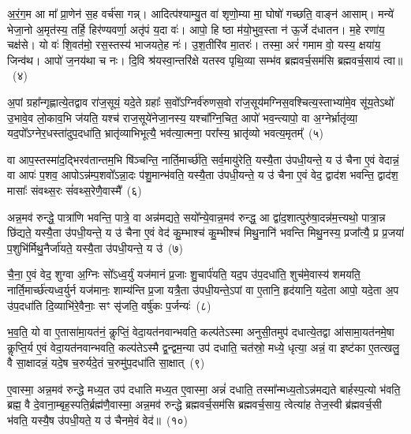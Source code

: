 अ॒रं॒ग॒म आ मा᳚ प्रा॒णेन॑ स॒ह वर्च॑सा गन्न्। आदित्प॑श्याम्यु॒त वा॑ शृणो॒म्या मा॒ घोषो॑ गच्छति॒ वाङ्न॑ आसाम्। मन्ये॑ भेजा॒नो अ॒मृत॑स्य॒ तर्\mbox{}हि॒ हिर॑ण्यवर्णा॒ अतृ॑पं य॒दा वः॑। आपो॒ हि ष्ठा म॑यो॒भुव॒स्ता न॑ ऊ॒र्जे द॑धातन। म॒हे रणा॑य॒ चक्ष॑से। यो वः॑ शि॒वत॑मो॒ रस॒स्तस्य॑ भाजयते॒ह नः॑। उ॒श॒तीरि॑व मा॒तरः॑। तस्मा॒ अरं॑ गमाम वो॒ यस्य॒ क्षया॑य॒ जिन्व॑थ। आपो॑ ज॒नय॑था च नः। दि॒वि श्र॑यस्वा॒न्तरि॑क्षे यतस्व पृथि॒व्या सम्भ॑व ब्रह्मवर्च॒सम॑सि ब्रह्मवर्च॒साय॑ त्वा॥~(४)

{\anuvakamend[{उ॒न्दन्ति॑ स॒मव॑ल्गत मधु॒पृचा᳚म्मा॒तरो॒ द्वाविꣳ॑शतिश्च}]}%

अ॒पां ग्रहा᳚न्गृह्णात्ये॒तद्वाव रा॑ज॒सूयं॒ यदे॒ते ग्रहाः᳚ स॒वो᳚\-ऽग्निर्व॑रुणस॒वो रा॑ज॒सूय॑मग्निस॒वश्चित्य॒स्ताभ्या॑मे॒व सू॑य॒ते\-ऽथो॑ उ॒भावे॒व लो॒काव॒भि ज॑यति॒ यश्च॑ राज॒सूये॑नेजा॒नस्य॒ यश्चा᳚ग्नि॒चित॒ आपो॑ भव॒न्त्यापो॒ वा अ॒ग्नेर्भ्रातृ॑व्या॒ यद॒पो᳚\-ऽग्नेर॒धस्ता॑दुप॒दधा॑ति॒ भ्रातृ॑व्याभिभूत्यै॒ भव॑त्या॒त्मना॒ परा᳚स्य॒ भ्रातृ॑व्यो भवत्य॒मृतम्᳚~(५)

वा आप॒स्तस्मा॑द॒द्भिरव॑तान्तम॒भि षि॑ञ्चन्ति॒ नार्ति॒मार्च्छ॑ति॒ सर्व॒मायु॑रेति॒ यस्यै॒ता उ॑पधी॒यन्ते॒ य उ॑ चैना ए॒वं वेदान्नं॒ वा आपः॑ प॒शव॒ आपो\-ऽन्न॑म्प॒शवो᳚\-ऽन्ना॒दः प॑शु॒मान्भ॑वति॒ यस्यै॒ता उ॑पधी॒यन्ते॒ य उ॑ चैना ए॒वं वेद॒ द्वाद॑श भवन्ति॒ द्वाद॑श॒ मासाः᳚ संवथ्स॒रः सं॑वथ्स॒रेणै॒वास्मै᳚~(६)

अन्न॒मव॑ रुन्द्धे॒ पात्रा॑णि भवन्ति॒ पात्रे॒ वा अन्न॑मद्यते॒ सयो᳚न्ये॒वान्न॒मव॑ रुन्द्ध॒ आ द्वा॑द॒शात्पुरु॑षा॒दन्न॑म॒त्त्यथो॒ पात्रा॒न्न छि॑द्यते॒ यस्यै॒ता उ॑पधी॒यन्ते॒ य उ॑ चैना ए॒वं वेद॑ कु॒म्भाश्च॑ कु॒म्भीश्च॑ मिथु॒नानि॑ भवन्ति मिथु॒नस्य॒ प्रजा᳚त्यै॒ प्र प्र॒जया॑ प॒शुभि॑र्मिथु॒नैर्जा॑यते॒ यस्यै॒ता उ॑पधी॒यन्ते॒ य उ॑~(७)

चै॒ना॒ ए॒वं वेद॒ शुग्वा अ॒ग्निः सो᳚\-ऽध्व॒र्युं यज॑मानं प्र॒जाः शु॒चार्प॑यति॒ यद॒प उ॑प॒दधा॑ति॒ शुच॑मे॒वास्य॑ शमयति॒ नार्ति॒मार्च्छ॑त्यध्व॒र्युर्न यज॑मानः॒ शाम्य॑न्ति प्र॒जा यत्रै॒ता उ॑पधी॒यन्ते॒\-ऽपां वा ए॒तानि॒ हृद॑यानि॒ यदे॒ता आपो॒ यदे॒ता अ॒प उ॑प॒दधा॑ति दि॒व्याभि॑रे॒वैनाः॒ सꣳ सृ॑जति॒ वर्\mbox{}षु॑कः प॒र्जन्यः॑~(८)

भ॒व॒ति॒ यो वा ए॒तासा॑मा॒यत॑नं॒ कॢप्तिं॒ वेदा॒यत॑नवान्भवति॒ कल्प॑ते\-ऽस्मा अनुसी॒तमुप॑ दधात्ये॒तद्वा आ॑सामा॒यत॑नमे॒षा कॢप्ति॒र्य ए॒वं वेदा॒यत॑नवान्भवति॒ कल्प॑ते\-ऽस्मै द्व॒न्द्वम॒न्या उप॑ दधाति॒ चत॑स्रो॒ मध्ये॒ धृत्या॒ अन्नं॒ वा इष्ट॑का ए॒तत्खलु॒ वै सा॒क्षादन्नं॒ यदे॒ष च॒रुर्यदे॒तं च॒रुमु॑प॒दधा॑ति सा॒क्षात्~(९)

ए॒वास्मा॒ अन्न॒मव॑ रुन्द्धे मध्य॒त उप॑ दधाति मध्य॒त ए॒वास्मा॒ अन्नं॑ दधाति॒ तस्मा᳚न्मध्य॒तो\-ऽन्न॑मद्यते बार्\mbox{}हस्प॒त्यो भ॑वति॒ ब्रह्म॒ वै दे॒वाना॒म्बृह॒स्पति॒र्ब्रह्म॑णै॒वास्मा॒ अन्न॒मव॑ रुन्द्धे ब्रह्मवर्च॒सम॑सि ब्रह्मवर्च॒साय॒ त्वेत्या॑ह तेज॒स्वी ब्र॑ह्मवर्च॒सी भ॑वति॒ यस्यै॒ष उ॑पधी॒यते॒ य उ॑ चैनमे॒वं वेद॑॥~(१०)

